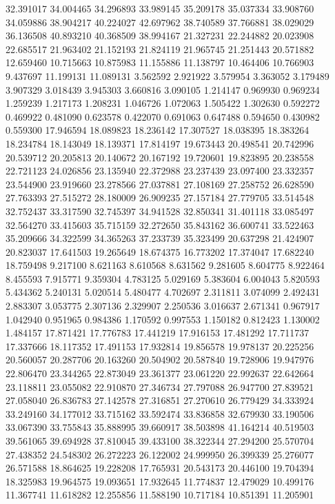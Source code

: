 32.391017
34.004465
34.296893
33.989145
35.209178
35.037334
33.908760
34.059886
38.904217
40.224027
42.697962
38.740589
37.766881
38.029029
36.136508
40.893210
40.368509
38.994167
21.327231
22.244882
20.023908
22.685517
21.963402
21.152193
21.824119
21.965745
21.251443
20.571882
12.659460
10.715663
10.875983
11.155886
11.138797
10.464406
10.766903
9.437697
11.199131
11.089131
3.562592
2.921922
3.579954
3.363052
3.179489
3.907329
3.018439
3.945303
3.660816
3.090105
1.214147
0.969930
0.969234
1.259239
1.217173
1.208231
1.046726
1.072063
1.505422
1.302630
0.592272
0.469922
0.481090
0.623578
0.422070
0.691063
0.647488
0.594650
0.430982
0.559300
17.946594
18.089823
18.236142
17.307527
18.038395
18.383264
18.234784
18.143049
18.139371
17.814197
19.673443
20.498541
20.742996
20.539712
20.205813
20.140672
20.167192
19.720601
19.823895
20.238558
22.721123
24.026856
23.135940
22.372988
23.237439
23.097400
23.332357
23.544900
23.919660
23.278566
27.037881
27.108169
27.258752
26.628590
27.763393
27.515272
28.180009
26.909235
27.157184
27.779705
33.514548
32.752437
33.317590
32.745397
34.941528
32.850341
31.401118
33.085497
32.564270
33.415603
35.715159
32.272650
35.843162
36.600741
33.522463
35.209666
34.322599
34.365263
37.233739
35.323499
20.637298
21.424907
20.823037
17.641503
19.265649
18.674375
16.773202
17.374047
17.682240
18.759498
9.217100
8.621163
8.610568
8.631562
9.281605
8.604775
8.922464
8.455593
7.915771
9.359304
4.783125
5.029169
5.383604
6.004043
5.820593
5.434362
5.240131
5.020514
5.480477
4.702697
2.311811
3.074099
2.492431
2.883307
3.053775
2.307136
2.329907
2.250536
3.016637
2.671341
0.967917
1.042940
0.951965
0.984386
1.170592
0.997553
1.150182
0.812423
1.130002
1.484157
17.871421
17.776783
17.441219
17.916153
17.481292
17.711737
17.337666
18.117352
17.491153
17.932814
19.856578
19.978137
20.225256
20.560057
20.287706
20.163260
20.504902
20.587840
19.728906
19.947976
22.806470
23.344265
22.873049
23.361377
23.061220
22.992637
22.642664
23.118811
23.055082
22.910870
27.346734
27.797088
26.947700
27.839521
27.058040
26.836783
27.142578
27.316851
27.270610
26.779429
34.333924
33.249160
34.177012
33.715162
33.592474
33.836858
32.679930
33.190506
33.067390
33.755843
35.888995
39.660917
38.503898
41.164214
40.519503
39.561065
39.694928
37.810045
39.433100
38.322344
27.294200
25.570704
27.438352
24.548302
26.272223
26.122002
24.999950
26.399339
25.276077
26.571588
18.864625
19.228208
17.765931
20.543173
20.446100
19.704394
18.325983
19.964575
19.093651
17.932645
11.774837
12.479029
10.499176
11.367741
11.618282
12.255856
11.588190
10.717184
10.851391
11.205901
